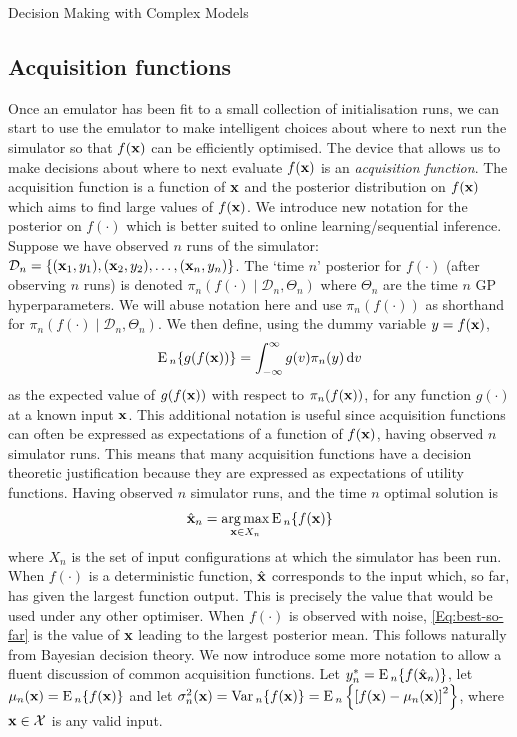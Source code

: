 \begin{chapter}{Decision Making with Complex Models \label{Chap:optimisation}}
\subsection{Acquisition functions}
Once an emulator has been fit to a small collection of initialisation runs, we can start to use the emulator to make intelligent choices about where to next run the simulator so that $f(\mathbf{x})$ can be efficiently optimised. The device that allows us to make decisions about where to next evaluate $f(\mathbf{x})$ is an \textit{acquisition function}. The acquisition function is a function of $\mathbf{x}$ and the posterior distribution on $f(\mathbf{x})$ which aims to find large values of $f(\mathbf{x})$. We introduce new notation for the posterior on $f(\cdot)$ which is better suited to online learning/sequential inference. Suppose we have observed $n$ runs of the simulator: $\mathcal{D}_n = \{(\mathbf{x}_1, y_1), (\mathbf{x}_2, y_2), \ldots, (\mathbf{x}_n, y_n)\}$. The `time $n$' posterior for $f(\cdot)$ (after observing $n$ runs) is denoted $\pi_n(f(\cdot) \mid \mathcal{D}_n, \Theta_n)$ where $\Theta_n$ are the time $n$ GP hyperparameters. We will abuse notation here and use $\pi_n(f(\cdot))$ as shorthand for $\pi_n(f(\cdot) \mid \mathcal{D}_n, \Theta_n)$. We then define, using the dummy variable $y = f(\mathbf{x})$,
\begin{equation}
 \textrm{E}\,_n\{g(f(\mathbf{x}))\} = \int_{-\infty}^{\infty} g(v) \pi_n(y) \,\text{d} v
\end{equation}
as the expected value of $g(f(\mathbf{x}))$ with respect to $\pi_n(f(\mathbf{x}))$, for any function $g(\cdot)$ at a known input $\mathbf{x}$. This additional notation is useful since acquisition functions can often be expressed as expectations of a function of $f(\mathbf{x})$, having observed $n$ simulator runs. This means that many acquisition functions have a decision theoretic justification because they are expressed as expectations of utility functions. Having observed $n$ simulator runs, and  the time $n$ optimal solution is
\begin{equation}
 \hat{\mathbf{x}}_n = \operatorname*{arg\,max}_{\mathbf{x} \in X_n} \textrm{E}\,_n \{ f(\mathbf{x}) \} \label{Eq:best-so-far}
\end{equation}
where $X_n$ is the set of input configurations at which the simulator has been run. When $f(\cdot)$ is a deterministic function, $\hat{\mathbf{x}}$ corresponds to the input which, so far, has given the largest function output. This is precisely the value that would be used under any other optimiser. When $f(\cdot)$ is observed with noise, \cref{Eq:best-so-far} is the value of $\mathbf{x}$ leading to the largest posterior mean. This follows naturally from Bayesian decision theory. We now introduce some more notation to allow a fluent discussion of common acquisition functions. Let $y^{*}_n = \textrm{E}\,_n \{ f(\hat{\mathbf{x}}_n) \}$, let $\mu_n(\mathbf{x}) = \textrm{E}\,_n \{ f(\mathbf{x}) \}$ and let $\sigma^2_n(\mathbf{x}) = \mathrm{Var}\,_n\{ f(\mathbf{x}) \} = \textrm{E}\,_n \left\{ \left[ f(\mathbf{x}) - \mu_n(\mathbf{x}) \right]^2 \right\}$, where $\mathbf{x} \in \mathcal{X}$ is any valid input.

\end{chapter}
